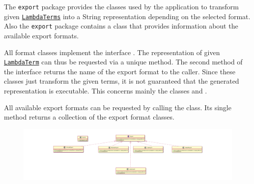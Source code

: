 The \texttt{export} package provides the classes used by the application to transform given \texttt{\hyperref[type:edu.kit.wavelength.client.model.term.LambdaTerm]{LambdaTerms}} into a String representation depending on the selected format. Also the \texttt{export} package contains a \texttt{} class that provides information about the available export formats. 

All format classes implement the interface \texttt{}. The representation of given \texttt{\hyperref[type:edu.kit.wavelength.client.model.term.LambdaTerm]{LambdaTerm}} can thus be requested via a unique method. 
The second method of the interface returns the name of the export format to the caller.
Since these classes just transform the given terms, it is not guaranteed that the generated representation is executable. This concerns mainly the classes \texttt{} and \texttt{}.

All available export formats can be requested by calling the \texttt{} class. Its single method returns a collection of the export format classes.  

\begin{figure}[H]
	\centering
	\includegraphics[width=\textwidth]{packageDiagrams/exportPackage}
\end{figure}
